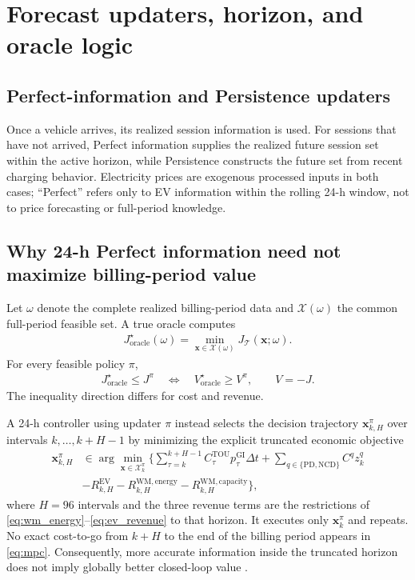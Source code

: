 \documentclass[final,5p,times]{elsarticle}
\newcommand{\dt}{\Delta t}
\newcommand{\EV}{\mathrm{EV}}
\newcommand{\GI}{\mathrm{GI}}
\newcommand{\TOU}{\mathrm{TOU}}
\newcommand{\PD}{\mathrm{PD}}
\newcommand{\NCD}{\mathrm{NCD}}
\newcommand{\WM}{\mathrm{WM}}
\newcommand{\calT}{\mathcal{T}}
\begin{document}
\section{Forecast updaters, horizon, and oracle logic}
\label{sec:oracle_logic}

\subsection{Perfect-information and Persistence updaters}
Once a vehicle arrives, its realized session information is used. For sessions
that have not arrived, Perfect information supplies the realized future session set within
the active horizon, while Persistence constructs the future set from recent
charging behavior. Electricity prices are exogenous processed inputs in both
cases; ``Perfect'' refers only to EV information within the rolling 24-h
window, not to price forecasting or full-period knowledge.

\subsection{Why 24-h Perfect information need not maximize billing-period value}
Let $\omega$ denote the complete realized billing-period data and
$\mathcal{X}(\omega)$ the common full-period feasible set. A true oracle computes
\begin{align}
J_{\mathrm{oracle}}^\star(\omega)
=\min_{\boldsymbol{x}\in\mathcal{X}(\omega)}
J_{\calT}(\boldsymbol{x};\omega). \label{eq:oracle}
\end{align}
For every feasible policy $\pi$,
\begin{align}
J_{\mathrm{oracle}}^\star\le J^\pi
\quad\Longleftrightarrow\quad
V_{\mathrm{oracle}}^\star\ge V^\pi,\qquad V=-J. \label{eq:oracle_dominance}
\end{align}
The inequality direction differs for cost and revenue.

A 24-h controller using updater $\pi$ instead selects the decision trajectory
$\boldsymbol{x}_{k,H}^{\pi}$ over intervals $k,\ldots,k+H-1$ by minimizing the
explicit truncated economic objective
\begin{align}
\boldsymbol{x}_{k,H}^{\pi}
&\in\arg\min_{\boldsymbol{x}\in\mathcal X_k^\pi}
\Bigg\{\sum_{\tau=k}^{k+H-1}C_\tau^{\TOU}p_\tau^{\GI}\dt
+\sum_{q\in\{\PD,\NCD\}}C^qz_k^q\nonumber\\
&-R_{k,H}^{\EV}-R_{k,H}^{\WM,\mathrm{energy}}
-R_{k,H}^{\WM,\mathrm{capacity}}\Bigg\}, \label{eq:mpc}
\end{align}
where $H=96$ intervals and the three revenue terms are the restrictions of
\eqref{eq:wm_energy}--\eqref{eq:ev_revenue} to that horizon. It executes only
$\boldsymbol{x}_k^\pi$ and repeats. No exact cost-to-go from $k+H$ to the end
of the billing period appears in \eqref{eq:mpc}. Consequently, more
accurate information inside the truncated horizon does not imply globally
better closed-loop value \cite{rawlings2017mpc}.
\end{document}
